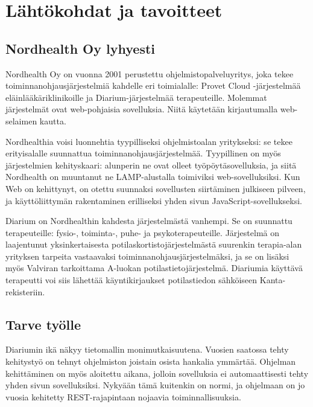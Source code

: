 \hypertarget{luxe4htuxf6kohdat-ja-tavoitteet}{%
\chapter{Lähtökohdat ja
tavoitteet}\label{luxe4htuxf6kohdat-ja-tavoitteet}}

\hypertarget{nordhealth-oy-lyhyesti}{%
\section{Nordhealth Oy lyhyesti}\label{nordhealth-oy-lyhyesti}}

Nordhealth Oy on vuonna 2001 perustettu ohjelmistopalveluyritys, joka
tekee toiminnanohjausjärjestelmiä kahdelle eri toimialalle: Provet Cloud
-järjestelmää eläinlääkäriklinikoille ja Diarium-järjestelmää
terapeuteille. Molemmat järjestelmät ovat web-pohjaisia sovelluksia.
Niitä käytetään kirjautumalla web-selaimen kautta.

Nordhealthia voisi luonnehtia tyypilliseksi ohjelmistoalan yritykseksi:
se tekee erityisalalle suunnattua toiminnanohjausjärjestelmää.
Tyypillinen on myös järjestelmien kehityskaari: alunperin ne ovat olleet
työpöytäsovelluksia, ja siitä Nordhealth on muuntanut ne LAMP-alustalla
toimiviksi web-sovelluksiksi. Kun Web on kehittynyt, on otettu suunnaksi
sovellusten siirtäminen julkiseen pilveen, ja käyttöliittymän
rakentaminen erilliseksi yhden sivun JavaScript-sovellukseksi.

Diarium on Nordhealthin kahdesta järjestelmästä vanhempi. Se on
suunnattu terapeuteille: fysio-, toiminta-, puhe- ja psykoterapeuteille.
Järjestelmä on laajentunut yksinkertaisesta
potilaskortistojärjestelmästä suurenkin terapia-alan yrityksen tarpeita
vastaavaksi toiminnanohjausjärjestelmäksi, ja se on lisäksi myös
Valviran tarkoittama A-luokan potilastietojärjestelmä. Diariumia
käyttävä terapeutti voi siis lähettää käyntikirjaukset potilastiedon
sähköiseen Kanta-rekisteriin.

\hypertarget{tarve-tyuxf6lle}{%
\section{Tarve työlle}\label{tarve-tyuxf6lle}}

Diariumin ikä näkyy tietomallin monimutkaisuutena. Vuosien saatossa
tehty kehitystyö on tehnyt ohjelmiston joistain osista hankalia
ymmärtää. Ohjelman kehittäminen on myös aloitettu aikana, jolloin
sovelluksia ei automaattisesti tehty yhden sivun sovelluksiksi. Nykyään
tämä kuitenkin on normi, ja ohjelmaan on jo vuosia kehitetty
REST-rajapintaan nojaavia toiminnallisuuksia.

